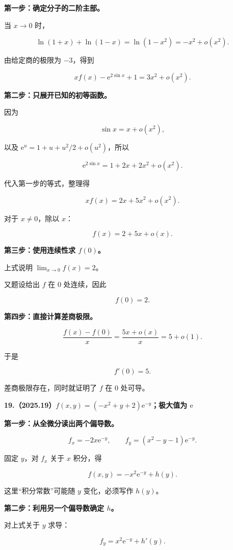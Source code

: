 \documentclass[UTF8,11pt,fontset=windows]{ctexart}
\begin{document}
\textbf{第一步：确定分子的二阶主部。}

当 $x\to0$ 时，

$$
\ln(1+x)+\ln(1-x)=\ln(1-x^2)=-x^2+o(x^2).
$$

由给定商的极限为 $-3$，得到

$$
xf(x)-\mathrm e^{2\sin x}+1
=3x^2+o(x^2).
$$

\textbf{第二步：只展开已知的初等函数。}

因为

$$
\sin x=x+o(x^2),
$$

以及 $\mathrm e^u=1+u+u^2/2+o(u^2)$，所以

$$
\mathrm e^{2\sin x}=1+2x+2x^2+o(x^2).
$$

代入第一步的等式，整理得

$$
xf(x)=2x+5x^2+o(x^2).
$$

对于 $x\ne0$，除以 $x$：

$$
f(x)=2+5x+o(x).
$$

\textbf{第三步：使用连续性求 $f(0)$。}

上式说明 $\lim_{x\to0}f(x)=2$。

又题设给出 $f$ 在 $0$ 处连续，因此

$$
f(0)=2.
$$

\textbf{第四步：直接计算差商极限。}

$$
\frac{f(x)-f(0)}x
=\frac{5x+o(x)}x=5+o(1).
$$

于是

$$
\boxed{f'(0)=5}.
$$

差商极限存在，同时就证明了 $f$ 在 $0$ 处可导。

\clearpage

\textbf{19.（2025.19）$f(x,y)=(-x^2+y+2)\mathrm e^{-y}$；极大值为 $\mathrm e$}

\textbf{第一步：从全微分读出两个偏导数。}

$$
f_x=-2x\mathrm e^{-y},\qquad
f_y=(x^2-y-1)\mathrm e^{-y}.
$$

固定 $y$，对 $f_x$ 关于 $x$ 积分，得

$$
f(x,y)=-x^2\mathrm e^{-y}+h(y).
$$

这里“积分常数”可能随 $y$ 变化，必须写作 $h(y)$。

\textbf{第二步：利用另一个偏导数确定 $h$。}

对上式关于 $y$ 求导：

$$
f_y=x^2\mathrm e^{-y}+h'(y).
$$
\end{document}
